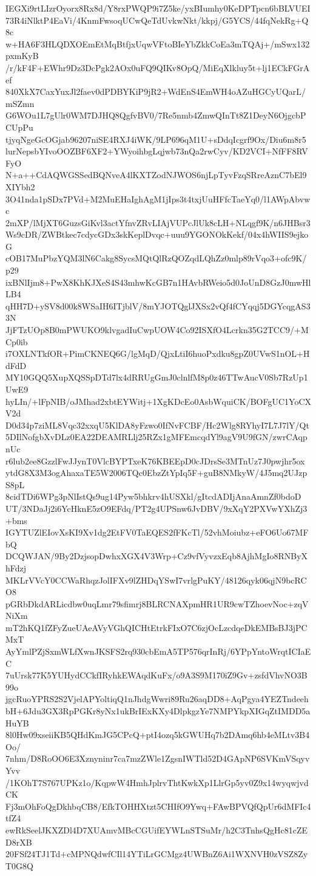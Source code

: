 IEGXi9rtLIzrOyorx8Rx8d/Y8rxPWQP9i7Z5ke/yxBIumhy0KeDPTpcn6bBLVUEI
73R4iNlktP4EaVi/4KnmFwsoqUCwQeTdUvkwNkt/kkpj/G5YCS/44fqNekRg+Q8c
w+HA6F3HLQDXOEmEtMqBtfjxUqwVFtoBIeYbZkkCoEa3mTQAj+/mSwx132pxmKyB
/r/kF4F+EWhr9Dz3DcPgk2AOx0uFQ9QIKv8OpQ/MiEqXlkluy5t+lj1ECkFGrAef
840XkX7CaxYuxJl2faev0dPDBYKiP9jR2+WdEnS4EmWH4oAZuHGCyUQarL/mSZmn
G6WOu1L7gUlr0WM7DJHQ8QgfvBV0/7Re5nmb4ZmwQInTt8Z1DeyN6OjgcbPCUpPu
tjyqNgeGcOGjab96207niSE4RXJ4iWK/9LP696qM1U+sDdqIcgrf9Ox/Diu6m8r5
lurNepsbYIvoOOZBF6XF2+YWyoihbgLqjwb73nQa2rwCyv/KD2VCI+NfFF8RVFyO
N+a++CdAQWGSSedBQNveA4lKXTZodNJWOS6njLpTyvFzqSRreAznC7bEl9XIYbh2
3O41nda1pSDx7PVd+M2MuEHaIghAgM1jIps3t4txjUuHFfcTaeYq0/l1AWpAbvwc
2mXP/lMjXT6GuzsGiKvl3actYfnvZRvLIAjVUPcJlUk8cLH+NLqgf9K/n6JHBsr3
Ws9cDR/ZWBtkec7cdycGDx3skKeplDvqc+uuu9YGONOkKekf/04x4hWIIS9ejkoG
cOB17MuPbzYQM3lN6Cakg8SycsMQtQlRzQOZqdLQhZz0mlp89rVqo3+ofc9K/p29
ixBNlIjm8+PwX8KhKJXeS4S43mhwKcGB7n1HAvbRWeio5d0JoUnD8GzJ0mwHlLB4
qHH7D+ySV8d00k8WSaIH6ITjblV/8mYJOTQglJXSx2vQf4fCYqqj5DGYcqgAS33N
JjFTzUOp8B0mPWUKO9klvgadIuCwpUOW4Co92ISXfO4Lcrkn35G2TCC9/+MCp0ib
i7OXLNTkfOR+PimCKNEQ6G/lgMqD/QjxLtiI6huoPxdku8gpZ0UVwS1nOL+HdFdD
MY10GQQ5XupXQSSpDTd7lx4dRRUgGmJ0clnlfM8p0z46TTwAucV0Sb7RzUp1UwE9
hyLIn/+lFpNIB/oJMhad2xbtEYWitj+1XgKDcEo0AsbWquiCK/BOFgUC1YoCXV2d
D0d34p7ziML8Vqc32xxqU5KlDA8yFzwo0IfNvFCBF/Hc2Wlg8RYhyI7L7J7lY/Qt
5DIlNofgbXvDLz0EA22DEAMRLlj25RZx1gMFEmcqdYl9agV9U9fGN/zwrCAqpnUc
r6lub2ee8GzzlFwJJynT0VlcBYPTxeK76KBEEpD0cJDrsSe3MTnUz7J0pwjhr5ox
ytdG8X3M3ogAhaxaTE5W2006TQc0EbzZtYpIq5F+guB8NMkyW/4J5mq2UJzpS8pL
8cidTDi6WPg3pNlIstQs9ug14Pyw5bhkrv4hUSXkl/gItcdADIjAnaAmnZf0bdoD
UT/3NDaJj2i6YcHknE5zO9EFdq/PT2g4UPSnw6JvDBV/9xXqY2PXVwYXhZj3+bms
IGYTUZlEIovXsKI9Xv1dg2EtFV0TaEQES2fFKcTl/52vhMoiubz+eFO6Uo67MFbQ
DCQWJAN/9By2DzjsopDwhxXGX4V3Wrp+Cz9vfVyvzxEqb8AjhMgIo8RNByXhFdzj
MKLrVVcY0CCWaRhqzJolIFXv9lZHDqYSwI7vrlgPuKY/48126qyk06qjN9bcRCO8
pGRbDkdARLicdbw0uqLmr79sfimrj8BLRCNAXpmHR1UR9cwTZhoevNoc+zqVNiXm
mT2hKQ1fZFyZueUAeAVyVGhQICHtEtrkFIxO7C6zjOcLzcdqeDkEMBsBJ3jPCMxT
AyYmlPZjSxmWLfXwnJKSFS2rq930cbEmA5TP576qrInRj/6YPpYntoWrqtICIaEC
7uUrsk77K5YUHydCCkfIRyhkEWAqdKuFx/o9A3S9M170iZ9Gv+zsfdVhvNO3B99o
jgcRuoYPRS2S2VjelAPYoltiqQ1nJhdgWwri89Ru26aqDD8+AqPgya4YEZTndeeh
bH+6Jdu3GX3RpPGKr8yNx1ukBrIExKXy4DlpkgzYe7NMPYkpXIGqZtIMDD5aHuYB
8l0Hw09xseiiKB5QHdKmJG5CPcQ+ptI4ozq5kGWUHq7b2DAmq6hb4eMLtv3B4Oo/
7nhm/D8RoOO6E3Xznyninr7ca7mzZWle1ZgsnIWTld52D4GApNP6SVKmVSqyvYvv
/1KOhT7S767UPKz1o/KqpwW4HmhJplrvThtKwkXp1LlrGp5yv0Z9x14wyqwjvdCK
Fj3mOhFoQgDkhbqCB8/EfkTOHHXtzt5CHIfO9Ywq+FAwBPVQfQpUr6dMFIc4tfZ4
ewRkSeelJKXZDl4D7XUAmvMBcCGUifEYWLnSTSuMr/h2C3TnhsQgHc81cZED8rXB
20FSf24TJ1Td+cMPNQdwfCIl14YTiLrGCMgz4UWBnZ6Ai1WXNVH0zVSZ8ZyT0G8Q
